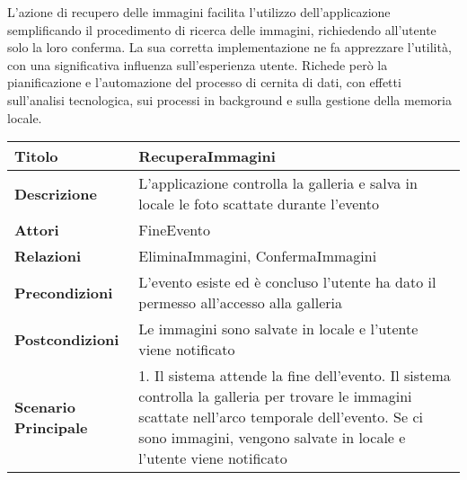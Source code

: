 L'azione di recupero delle immagini facilita l'utilizzo dell'applicazione semplificando il procedimento di ricerca delle immagini, 
richiedendo all'utente solo la loro conferma.
La sua corretta implementazione ne fa apprezzare l'utilità, con una significativa influenza sull'esperienza utente.
Richede però la pianificazione e l'automazione del processo di cernita di dati, 
con effetti sull'analisi tecnologica, sui processi in background e sulla gestione della memoria locale.\\
\begin{table}[htb]
    \begin{tabular} {|P{4.5cm}|P{11cm}|}
        \hline
        \textbf{Titolo}                   & RecuperaImmagini                                                                                                                           \\
        \hline
        \textbf{Descrizione}              & L'applicazione controlla la galleria e salva in locale le foto scattate durante l'evento                                                   \\
        \hline
        \textbf{Attori}                   & FineEvento                                                                                                                                 \\
        \hline
        \textbf{Relazioni}                & EliminaImmagini, ConfermaImmagini                                                                                                          \\
        \hline
        \textbf{Precondizioni}            & L'evento esiste ed è concluso\linebreak
        l'utente ha dato il permesso all'accesso alla galleria                                                                                                                         \\
        \hline
        \textbf{Postcondizioni}           & Le immagini sono salvate in locale e l'utente viene notificato                                                                             \\
        \hline
        \textbf{Scenario Principale}      & 1. Il sistema attende la fine dell'evento. Il sistema controlla la galleria per trovare le immagini scattate nell'arco temporale dell'evento. Se ci sono immagini, vengono salvate in locale e l'utente viene notificato                                                                                                  \\

\end{tabular}
\end{table}
